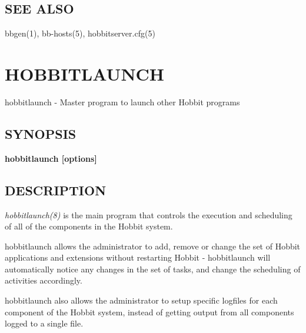 \subsection{SEE ALSO}
bbgen(1), bb-hosts(5), hobbitserver.cfg(5) 

 
%
%
\newpage
\section{HOBBITLAUNCH}
 hobbitlaunch - Master program to launch other Hobbit programs 

 
\subsection{SYNOPSIS}
\textbf{hobbitlaunch [options]}


 
\subsection{DESCRIPTION}
\emph{hobbitlaunch(8)} is the main program that controls the execution
and scheduling of all of the components in the Hobbit system. 


  hobbitlaunch allows the administrator to add, remove or change the
  set of Hobbit applications and extensions without restarting Hobbit
  - hobbitlaunch will automatically notice any changes in the set of
  tasks, and change the scheduling of activities accordingly. 



  hobbitlaunch also allows the administrator to setup specific
  logfiles for each component of the Hobbit system, instead of getting
  output from all components logged to a single file. 



 
